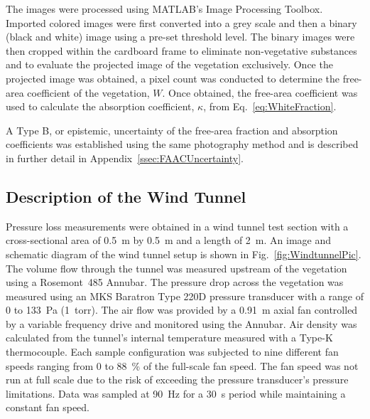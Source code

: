 \documentclass[12pt]{article}
\begin{document}
The images were processed using MATLAB's Image Processing Toolbox. Imported colored images were first converted into a grey scale and then a binary (black and white) image using a pre-set threshold level. The binary images were then cropped within the cardboard frame to eliminate non-vegetative substances and to evaluate the projected image of the vegetation exclusively. Once the projected image was obtained, a pixel count was conducted to determine the free-area coefficient of the vegetation, $W$. Once obtained, the free-area coefficient was used to calculate the absorption coefficient, $\kappa$, from Eq.~\ref{eq:WhiteFraction}.

A Type B, or epistemic, uncertainty of the free-area fraction and absorption coefficients was established using the same photography method and is described in further detail in Appendix~\ref{ssec:FAACUncertainty}.

\subsection{Description of the Wind Tunnel}
\label{ssec:headingscap}

Pressure loss measurements were obtained in a wind tunnel test section with a cross-sectional area of 0.5~\si{m} by 0.5~\si{m} and a length of 2~\si{m}. An image and schematic diagram of the wind tunnel setup is shown in Fig.~\ref{fig:WindtunnelPic}. The volume flow through the tunnel was measured upstream of the vegetation using a Rosemont~485 Annubar. The pressure drop across the vegetation was measured using an MKS Baratron Type 220D pressure transducer with a range of 0 to 133~Pa (1~torr). The air flow was provided by a 0.91~m axial fan controlled by a variable frequency drive and monitored using the Annubar. Air density was calculated from the tunnel's internal temperature measured with a Type-K thermocouple. Each sample configuration was subjected to nine different fan speeds ranging from 0 to 88~\% of the full-scale fan speed. The fan speed was not run at full scale due to the risk of exceeding the pressure transducer's pressure limitations. Data was sampled at 90~\si{Hz} for a 30~\si{s} period while maintaining a constant fan speed.
\end{document}
